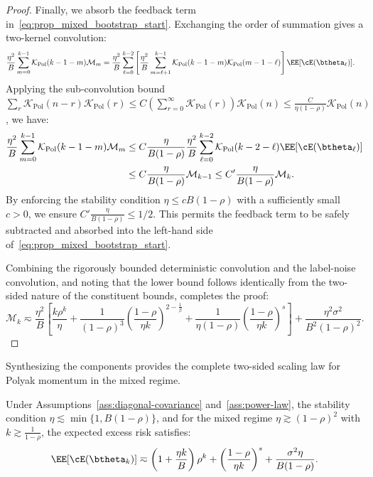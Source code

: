 \begin{proof}
Finally, we absorb the feedback term in~\eqref{eq:prop_mixed_bootstrap_start}. Exchanging the order of summation gives a two-kernel convolution:
\begin{align*}
    \frac{\eta^2}{B}\sum_{m=0}^{k-1}\mathcal K_{\mathrm{Pol}}(k-1-m)\mathcal M_m
    &= \frac{\eta^2}{B}\sum_{\ell=0}^{k-2} \left[ \frac{\eta^2}{B}\sum_{m=\ell+1}^{k-1} \mathcal K_{\mathrm{Pol}}(k-1-m)\mathcal K_{\mathrm{Pol}}(m-1-\ell) \right] \EE[\cE(\btheta_\ell)].
\end{align*}
Applying the sub-convolution bound $\sum_{r} \mathcal K_{\mathrm{Pol}}(n-r)\mathcal K_{\mathrm{Pol}}(r) \le C \left(\sum_{r=0}^{\infty}\mathcal K_{\mathrm{Pol}}(r)\right) \mathcal K_{\mathrm{Pol}}(n) \le \frac{C}{\eta(1-\rho)}\mathcal K_{\mathrm{Pol}}(n)$, we have:
\begin{align*}
    \frac{\eta^2}{B}\sum_{m=0}^{k-1}\mathcal K_{\mathrm{Pol}}(k-1-m)\mathcal M_m
    &\le C\frac{\eta}{B(1-\rho)} \frac{\eta^2}{B}\sum_{\ell=0}^{k-2}\mathcal K_{\mathrm{Pol}}(k-2-\ell)\EE[\cE(\btheta_\ell)] \\
    &\le C\frac{\eta}{B(1-\rho)}\mathcal M_{k-1} \le C'\frac{\eta}{B(1-\rho)}\mathcal M_k .
\end{align*}
By enforcing the stability condition $\eta\le cB(1-\rho)$ with a sufficiently small $c>0$, we ensure $C'\frac{\eta}{B(1-\rho)} \le 1/2$. This permits the feedback term to be safely subtracted and absorbed into the left-hand side of~\eqref{eq:prop_mixed_bootstrap_start}.

Combining the rigorously bounded deterministic convolution and the label-noise convolution, and noting that the lower bound follows identically from the two-sided nature of the constituent bounds, completes the proof:
\[
    \mathcal M_k \eqsim \frac{\eta^2}{B} \left[ \frac{k\rho^k}{\eta} + \frac{1}{(1-\rho)^3} \left(\frac{1-\rho}{\eta k}\right)^{2-\frac{1}{\beta}} + \frac{1}{\eta(1-\rho)} \left(\frac{1-\rho}{\eta k}\right)^s \right] + \frac{\eta^2\sigma^2}{B^2(1-\rho)^2}.
\]
\end{proof}

Synthesizing the components provides the complete two-sided scaling law for Polyak momentum in the mixed regime.

\begin{theorem}
\label{thm:pol_two_sided_scaling}
Under Assumptions~\ref{ass:diagonal-covariance} and~\ref{ass:power-law}, the stability condition $\eta\lesssim \min\{1,B(1-\rho)\}$, and for the mixed regime $\eta\gtrsim(1-\rho)^2$ with $k \gtrsim \frac{1}{1-\rho}$, the expected excess risk satisfies:
\[
    \EE[\cE(\btheta_k)]
    \eqsim
    \left(1+\frac{\eta k}{B}\right) \rho^k
    +
    \left(\frac{1-\rho}{\eta k}\right)^s
    +
    \frac{\sigma^2\eta}{B(1-\rho)}.
\]
\end{theorem}

